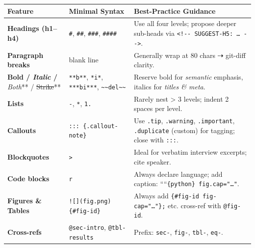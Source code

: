 \documentclass[
  11pt,
  letterpaper,
]{book}
\begin{document}
\begin{longtable}[]{@{}
  >{\raggedright\arraybackslash}p{}
  >{\raggedright\arraybackslash}p{}
  >{\raggedright\arraybackslash}p{}@{}}
\toprule\noalign{}
\begin{minipage}[b]{\linewidth}\raggedright
Feature
\end{minipage} & \begin{minipage}[b]{\linewidth}\raggedright
Minimal Syntax
\end{minipage} & \begin{minipage}[b]{\linewidth}\raggedright
Best-Practice Guidance
\end{minipage} \\
\midrule\noalign{}
\endhead
\bottomrule\noalign{}
\endlastfoot
\textbf{Headings (h1--h4)} & \texttt{\#}, \texttt{\#\#},
\texttt{\#\#\#}, \texttt{\#\#\#\#} & Use all four levels; propose deeper
sub-heads via
\texttt{\textless{}!-\/-\ SUGGEST-H5:\ …\ -\/-\textgreater{}}. \\
\textbf{Paragraph breaks} & blank line & Generally wrap at 80 chars ⇢
git-diff clarity. \\
\textbf{Bold / \emph{Italic} / }\emph{Both}** / \st{Strike}** &
\texttt{**b**}, \texttt{*i*}, \texttt{***bi***},
\texttt{\textasciitilde{}\textasciitilde{}del\textasciitilde{}\textasciitilde{}}
& Reserve bold for \emph{semantic} emphasis, italics for \emph{titles \&
meta}. \\
\textbf{Lists} & \texttt{-}, \texttt{*}, \texttt{1.} & Rarely nest
\textgreater{} 3 levels; indent 2 spaces per level. \\
\textbf{Callouts} & \texttt{:::\ \{.callout-note\}} & Use \texttt{.tip},
\texttt{.warning}, \texttt{.important}, \texttt{.duplicate} (custom) for
tagging; close with \texttt{:::}. \\
\textbf{Blockquotes} & \texttt{\textgreater{}} & Ideal for verbatim
interview excerpts; cite speaker. \\
\textbf{Code blocks} &
\texttt{\textasciigrave{}\textasciigrave{}\textasciigrave{}r} & Always
declare language; add caption: ````\texttt{\{python\}\ fig.cap="…"}. \\
\textbf{Figures \& Tables} & \texttt{!{[}{]}(fig.png)\{\#fig-id\}} &
Always add \texttt{\{\#fig-id\ fig-cap="…"\};} etc. cross-ref with
\texttt{@fig-id}. \\
\textbf{Cross-refs} & \texttt{@sec-intro}, \texttt{@tbl-results} &
Prefix: \texttt{sec-}, \texttt{fig-}, \texttt{tbl-}, \texttt{eq-}. \\

\end{longtable}
\end{document}
